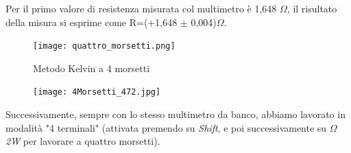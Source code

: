 \begin{table}[!ht]
    \caption{Multimetro 34401A (6$\sfrac{1}{2}$ cifre), 2 Morsetti, R (dei morsetti) = 0,133 $\Omega$}
    \label{tab:mult_2w}
\end{table}
\FloatBarrier
 Per il primo valore di resistenza misurata col multimetro è 1,648 $\Omega$, il risultato della misura si esprime come R=(+1,648 $\pm$ 0,004)$\Omega$.


\begin{figure}[h]
    \centering
    \texttt{[image: quattro\_morsetti.png]}
    \caption{Metodo Kelvin a 4 morsetti}
    \label{fig:quattro morsetti}
\end{figure}
\FloatBarrier



\begin{figure}
    \centering
    \texttt{[image: 4Morsetti\_472.jpg]}
    \label{fig:4morsetti}
\end{figure}
\FloatBarrier
Successivamente, sempre con lo stesso multimetro da banco, abbiamo lavorato in modalità "4 terminali" (attivata premendo su \emph{Shift}, e poi successivamente su \emph{$\Omega$2W} per lavorare a quattro morsetti).


